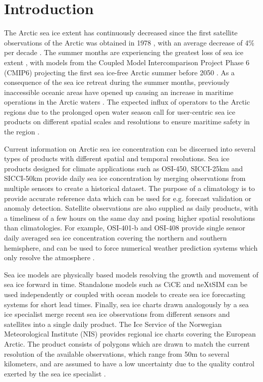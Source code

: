 \documentclass[../main/thesis.tex]{subfiles}
\begin{document}
\section{Introduction}
\label{sec:introduction}
The Arctic sea ice extent has continuously decreased since the first satellite observations of the Arctic was obtained in 1978 \citep{Serreze2019}, with an average decrease of 4\% per decade \citep{Cavalieri2012}. The summer months are experiencing the greatest loss of sea ice extent \citep{Comiso2017}, with models from the Coupled Model Intercomparison Project Phase 6 (CMIP6) projecting the first sea ice-free Arctic summer before 2050 \citep{Notz2020}. As a consequence of the sea ice retreat during the summer months, previously inaccessible oceanic areas have opened up causing an increase in maritime operations in the Arctic waters \citep{Ho2010, Eguiluz2016}. The expected influx of operators to the Arctic regions due to the prolonged open water season call for user-centric sea ice products on different spatial scales and resolutions to ensure maritime safety in the region \citep{Wagner2020, Veland2021}.

Current information on Arctic sea ice concentration can be discerned into several types of products with different spatial and temporal resolutions. Sea ice products designed for climate applications such as OSI-450, SICCI-25km and SICCI-50km provide daily sea ice concentration by merging observations from multiple sensors to create a historical dataset. The purpose of a climatology is to provide accurate reference data \citep{Lavergne2019} which can be used for e.g. forecast validation or anomaly detection. Satellite observations are also supplied as daily products, with a timeliness of a few hours on the same day and posing higher spatial resolutions than climatologies. For example, OSI-401-b \citep{Tonboe2017} and OSI-408 \citep{Lavelle2016} provide single sensor daily averaged sea ice concentration covering the northern and southern hemisphere, and can be used to force numerical weather prediction systems which only resolve the atmosphere \citep{Mueller2017}.

Sea ice models are physically based models resolving the growth and movement of sea ice forward in time. Standalone models such as CiCE \citep{Hunke1997} and neXtSIM \citep{Williams2021} can be used independently or coupled with ocean models \citep{Roehrs2022} to create sea ice forecasting systems for short lead times. Finally, sea ice charts drawn analogously by a sea ice specialist merge recent sea ice observations from different sensors and satellites into a single daily product. The Ice Service of the Norwegian Meteorological Institute (NIS) provides regional ice charts covering the European Arctic. The product consists of polygons which are drawn to match the current resolution of the available observations, which range from 50m to several kilometers, and are assumed to have a low uncertainty due to the quality control exerted by the sea ice specialist \citep{Dinessen2020}.
\end{document}
